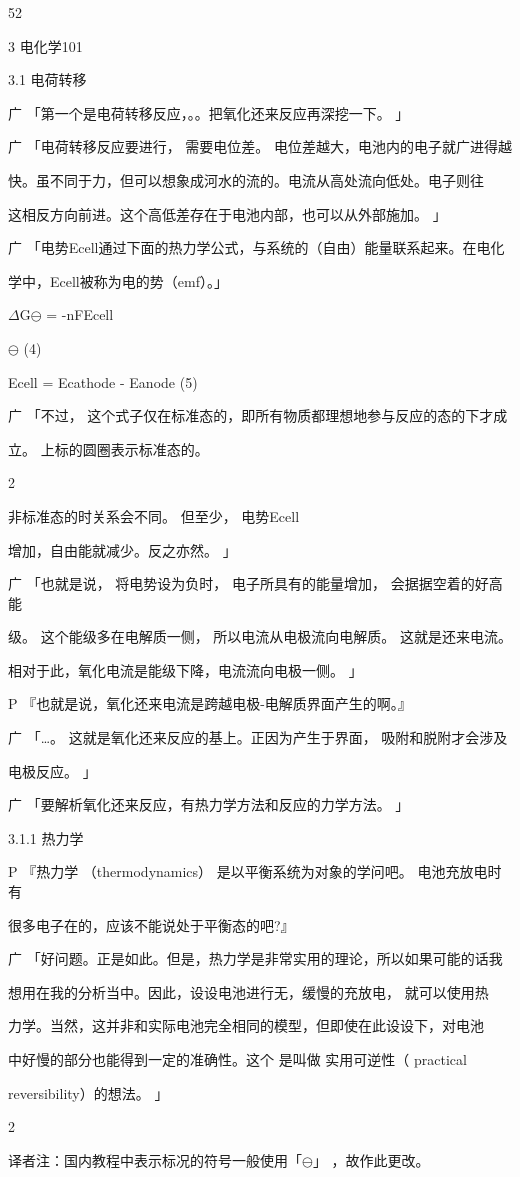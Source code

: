 52\par
3 电化学101\par
3.1 电荷转移\par
广 「第一个是电荷转移反应，。。把氧化还来反应再深挖一下。 」\par
广 「电荷转移反应要进行， 需要电位差。 电位差越大，电池内的电子就广进得越\par
快。虽不同于力，但可以想象成河水的流的。电流从高处流向低处。电子则往\par
这相反方向前进。这个高低差存在于电池内部，也可以从外部施加。 」\par
广 「电势Ecell通过下面的热力学公式，与系统的（自由）能量联系起来。在电化\par
学中，Ecell被称为电的势（emf）。」\par
$\Delta$G$\ominus$ = -nFEcell\par
$\ominus$ (4)\par
Ecell = Ecathode - Eanode (5)\par
广 「不过， 这个式子仅在标准态的，即所有物质都理想地参与反应的态的下才成\par
立。 上标的圆圈表示标准态的。\par
2\par
非标准态的时关系会不同。 但至少， 电势Ecell\par
增加，自由能就减少。反之亦然。 」\par
广 「也就是说， 将电势设为负时， 电子所具有的能量增加， 会据据空着的好高能\par
级。 这个能级多在电解质一侧， 所以电流从电极流向电解质。 这就是还来电流。\par
相对于此，氧化电流是能级下降，电流流向电极一侧。 」\par
P 『也就是说，氧化还来电流是跨越电极-电解质界面产生的啊。』\par
广 「…。 这就是氧化还来反应的基上。正因为产生于界面， 吸附和脱附才会涉及\par
电极反应。 」\par
广 「要解析氧化还来反应，有热力学方法和反应的力学方法。 」\par
3.1.1 热力学\par
P 『热力学 （thermodynamics） 是以平衡系统为对象的学问吧。 电池充放电时有\par
很多电子在的，应该不能说处于平衡态的吧?』\par
广 「好问题。正是如此。但是，热力学是非常实用的理论，所以如果可能的话我\par
想用在我的分析当中。因此，设设电池进行无，缓慢的充放电， 就可以使用热\par
力学。当然，这并非和实际电池完全相同的模型，但即使在此设设下，对电池\par
中好慢的部分也能得到一定的准确性。这个 是叫做 实用可逆性（ practical\par
reversibility）的想法。 」\par
2\par
译者注：国内教程中表示标况的符号一般使用「$\ominus$」 ，故作此更改。\par

